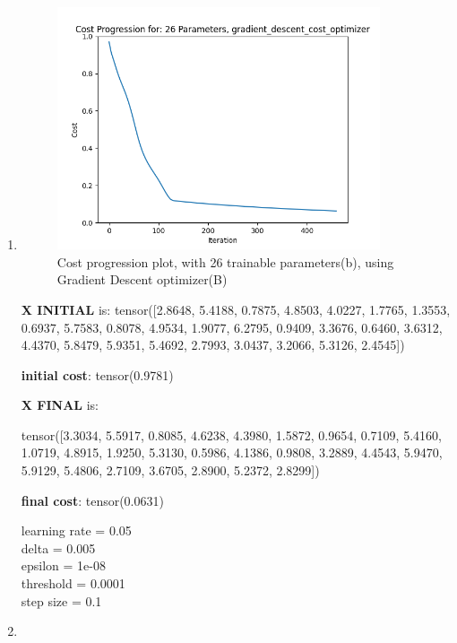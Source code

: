 \documentclass[inscr,ack,preface]{diphdthesis}
\begin{document}
\begin{enumerate}[label=\textbf{\Alph*.}]
    \item \textbf{ }
    
    \begin{figure}[H]
        \centering
        \includegraphics[width=0.9\textwidth]{26_b.png}
        \caption{Cost progression plot, with 26 trainable parameters(b), using Gradient Descent optimizer(B)} 
        \label{fig:fig2}
    \end{figure}
    
    \textbf{X INITIAL} is:
    tensor([2.8648, 5.4188, 0.7875, 4.8503, 4.0227, 1.7765, 1.3553, 0.6937, 5.7583,
            0.8078, 4.9534, 1.9077, 6.2795, 0.9409, 3.3676, 0.6460, 3.6312, 4.4370,
            5.8479, 5.9351, 5.4692, 2.7993, 3.0437, 3.2066, 5.3126, 2.4545])
            
    \textbf{initial cost}: tensor(0.9781)
    
    \textbf{X FINAL} is:
    
    tensor([3.3034, 5.5917, 0.8085, 4.6238, 4.3980, 1.5872, 0.9654, 0.7109, 5.4160,
            1.0719, 4.8915, 1.9250, 5.3130, 0.5986, 4.1386, 0.9808, 3.2889, 4.4543,
            5.9470, 5.9129, 5.4806, 2.7109, 3.6705, 2.8900, 5.2372, 2.8299])
    
    \textbf{final cost}: tensor(0.0631)
    
    learning rate =  0.05 \\
    delta =  0.005 \\
    epsilon =  1e-08 \\
    threshold =  0.0001\\ 
    step size =  0.1 \\
    
    \item{ }
    

\end{enumerate}
\end{document}

